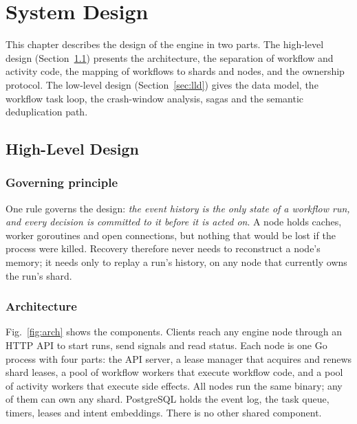 \clearpage
\chapter{System Design}

This chapter describes the design of the engine in two parts. The high-level
design (Section~\ref{sec:hld}) presents the architecture, the separation of
workflow and activity code, the mapping of workflows to shards and nodes, and
the ownership protocol. The low-level design (Section~\ref{sec:lld}) gives the
data model, the workflow task loop, the crash-window analysis, sagas and the
semantic deduplication path.

\section{High-Level Design}
\label{sec:hld}

\subsection{Governing principle}

One rule governs the design: \emph{the event history is the only state of a
workflow run, and every decision is committed to it before it is acted on}.
A node holds caches, worker goroutines and open connections, but nothing that
would be lost if the process were killed. Recovery therefore never needs to
reconstruct a node's memory; it needs only to replay a run's history, on any
node that currently owns the run's shard.

\subsection{Architecture}

Fig.~\ref{fig:arch} shows the components. Clients reach any engine node
through an HTTP API to start runs, send signals and read status. Each node is
one Go process with four parts: the API server, a lease manager that acquires
and renews shard leases, a pool of workflow workers that execute workflow
code, and a pool of activity workers that execute side effects. All nodes run
the same binary; any of them can own any shard. PostgreSQL holds the event
log, the task queue, timers, leases and intent embeddings. There is no other
shared component.

